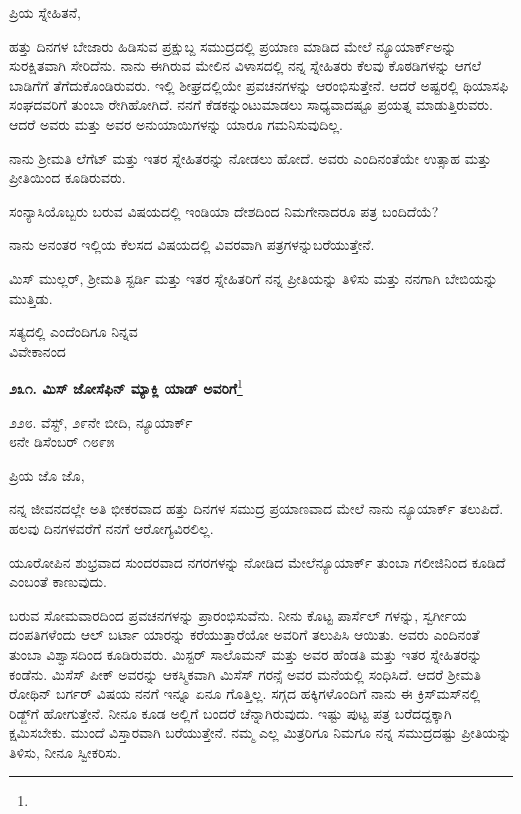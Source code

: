 \vspace{-0.3cm}

\noindent
ಪ್ರಿಯ ಸ್ನೇಹಿತನೆ,

ಹತ್ತು ದಿನಗಳ ಬೇಜಾರು ಹಿಡಿಸುವ ಪ್ರಕ್ಷುಬ್ದ ಸಮುದ್ರದಲ್ಲಿ ಪ್ರಯಾಣ ಮಾಡಿದ ಮೇಲೆ ನ್ಯೂಯಾರ್ಕ್‌ಅನ್ನು ಸುರಕ್ಷಿತವಾಗಿ ಸೇರಿದೆನು. ನಾನು ಈಗಿರುವ ಮೇಲಿನ ವಿಳಾಸದಲ್ಲಿ ನನ್ನ ಸ್ನೇಹಿತರು ಕೆಲವು ಕೊಠಡಿಗಳನ್ನು ಆಗಲೆ ಬಾಡಿಗೆಗೆ ತೆಗೆದುಕೊಂಡಿರುವರು. ಇಲ್ಲಿ ಶೀಘ್ರದಲ್ಲಿಯೇ ಪ್ರವಚನಗಳನ್ನು ಆರಂಭಿಸುತ್ತೇನೆ. ಆದರೆ ಅಷ್ಟರಲ್ಲಿ ಥಿಯಾಸಫಿ ಸಂಘದವರಿಗೆ ತುಂಬಾ ರೇಗಿಹೋಗಿದೆ. ನನಗೆ ಕೆಡಕನ್ನುಂಟುಮಾಡಲು ಸಾಧ್ಯವಾದಷ್ಟೂ ಪ್ರಯತ್ನ ಮಾಡುತ್ತಿರುವರು. ಆದರೆ ಅವರು ಮತ್ತು ಅವರ ಅನುಯಾಯಿಗಳನ್ನು ಯಾರೂ ಗಮನಿಸುವುದಿಲ್ಲ.

ನಾನು ಶ‍್ರೀಮತಿ ಲೆಗೆಟ್ ಮತ್ತು ಇತರ ಸ್ನೇಹಿತರನ್ನು ನೋಡಲು ಹೋದೆ. ಅವರು ಎಂದಿನಂತೆಯೇ ಉತ್ಸಾಹ ಮತ್ತು ಪ್ರೀತಿಯಿಂದ ಕೂಡಿರುವರು.

ಸಂನ್ಯಾಸಿಯೊಬ್ಬರು ಬರುವ ವಿಷಯದಲ್ಲಿ ಇಂಡಿಯಾ ದೇಶದಿಂದ ನಿಮಗೇನಾದರೂ ಪತ್ರ ಬಂದಿದೆಯೆ?

ನಾನು ಅನಂತರ ಇಲ್ಲಿಯ ಕೆಲಸದ ವಿಷಯದಲ್ಲಿ ವಿವರವಾಗಿ ಪತ್ರಗಳನ್ನು\break ಬರೆಯುತ್ತೇನೆ.

ಮಿಸ್ ಮುಲ್ಲರ್, ಶ‍್ರೀಮತಿ ಸ್ಟರ್ಡಿ ಮತ್ತು ಇತರ ಸ್ನೇಹಿತರಿಗೆ ನನ್ನ ಪ್ರೀತಿಯನ್ನು ತಿಳಿಸು ಮತ್ತು ನನಗಾಗಿ ಬೇಬಿಯನ್ನು ಮುತ್ತಿಡು.

{\flushright
ಸತ್ಯದಲ್ಲಿ ಎಂದೆಂದಿಗೂ ನಿನ್ನವ\\ವಿವೇಕಾನಂದ\par}

\begin{center}
\textbf{೨೩೧. ಮಿಸ್ ಜೋಸೆಫಿನ್ ಮ್ಯಾಕ್ಲಿ ಯಾಡ್ ಅವರಿಗೆ}\footnote{}
\end{center}

\begin{flushright}
೨೨೮. ವೆಸ್ಟ್, ೨೯ನೇ ಬೀದಿ, ನ್ಯೂಯಾರ್ಕ್\\೮ನೇ ಡಿಸೆಂಬರ್ ೧೮೯೫
\end{flushright}

\noindent
ಪ್ರಿಯ ಜೊ ಜೊ,

ನನ್ನ ಜೀವನದಲ್ಲೇ ಅತಿ ಭೀಕರವಾದ ಹತ್ತು ದಿನಗಳ ಸಮುದ್ರ ಪ್ರಯಾಣವಾದ ಮೇಲೆ ನಾನು ನ್ಯೂಯಾರ್ಕ್ ತಲುಪಿದೆ. ಹಲವು ದಿನಗಳವರೆಗೆ ನನಗೆ ಆರೋಗ್ಯವಿರಲಿಲ್ಲ.

ಯೂರೋಪಿನ ಶುಭ್ರವಾದ ಸುಂದರವಾದ ನಗರಗಳನ್ನು ನೋಡಿದ ಮೇಲೆ\break ನ್ಯೂಯಾರ್ಕ್‌ ತುಂಬಾ ಗಲೀಜಿನಿಂದ ಕೂಡಿದೆ ಎಂಬಂತೆ ಕಾಣುವುದು.

ಬರುವ ಸೋಮವಾರದಿಂದ ಪ್ರವಚನಗಳನ್ನು ಪ್ರಾರಂಭಿಸುವೆನು. ನೀನು ಕೊಟ್ಟ ಪಾರ್ಸೆಲ್ ಗಳನ್ನು, ಸ್ವರ್ಗೀಯ ದಂಪತಿಗಳೆಂದು ಆಲ್ ಬರ್ಟಾ ಯಾರನ್ನು ಕರೆಯುತ್ತಾರೆಯೋ ಅವರಿಗೆ ತಲುಪಿಸಿ ಆಯಿತು. ಅವರು ಎಂದಿನಂತೆ ತುಂಬಾ ವಿಶ್ವಾಸದಿಂದ ಕೂಡಿರುವರು. ಮಿಸ್ಟರ್‌ ಸಾಲೊಮನ್ ಮತ್ತು ಅವರ ಹೆಂಡತಿ ಮತ್ತು ಇತರ ಸ್ನೇಹಿತರನ್ನು ಕಂಡೆನು. ಮಿಸೆಸ್ ಪೀಕ್ ಅವರನ್ನು ಆಕಸ್ಮಿಕವಾಗಿ ಮಿಸೆಸ್ ಗರನ್ಸೆ ಅವರ ಮನೆಯಲ್ಲಿ ಸಂಧಿಸಿದೆ. ಆದರೆ ಶ‍್ರೀಮತಿ ರೋಥಿನ್ ಬರ್ಗರ್ ವಿಷಯ ನನಗೆ ಇನ್ನೂ ಏನೂ ಗೊತ್ತಿಲ್ಲ. ಸಗ್ಗದ ಹಕ್ಕಿಗಳೊಂದಿಗೆ ನಾನು ಈ ಕ್ರಿಸ್‌ಮಸ್‌ನಲ್ಲಿ ರಿಡ್ಜ್‌ಗೆ ಹೋಗುತ್ತೇನೆ. ನೀನೂ ಕೂಡ ಅಲ್ಲಿಗೆ ಬಂದರೆ ಚೆನ್ನಾಗಿರುವುದು. ಇಷ್ಟು ಪುಟ್ಟ ಪತ್ರ ಬರೆದದ್ದಕ್ಕಾಗಿ ಕ್ಷಮಿಸಬೇಕು. ಮುಂದೆ ವಿಸ್ತಾರವಾಗಿ ಬರೆಯುತ್ತೇನೆ. ನಮ್ಮ ಎಲ್ಲ ಮಿತ್ರರಿಗೂ ನಿಮಗೂ ನನ್ನ ಸಮುದ್ರದಷ್ಟು ಪ್ರೀತಿಯನ್ನು ತಿಳಿಸು, ನೀನೂ ಸ್ವೀಕರಿಸು.

